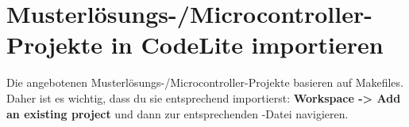 \section*{Musterlösungs-/Microcontroller-Projekte in CodeLite importieren}

Die angebotenen Musterlösungs-/Microcontroller-Projekte basieren auf Makefiles.
Daher ist es wichtig, dass du sie entsprechend importierst: \textbf{Workspace -> Add an existing project} und dann zur entsprechenden -Datei navigieren.
